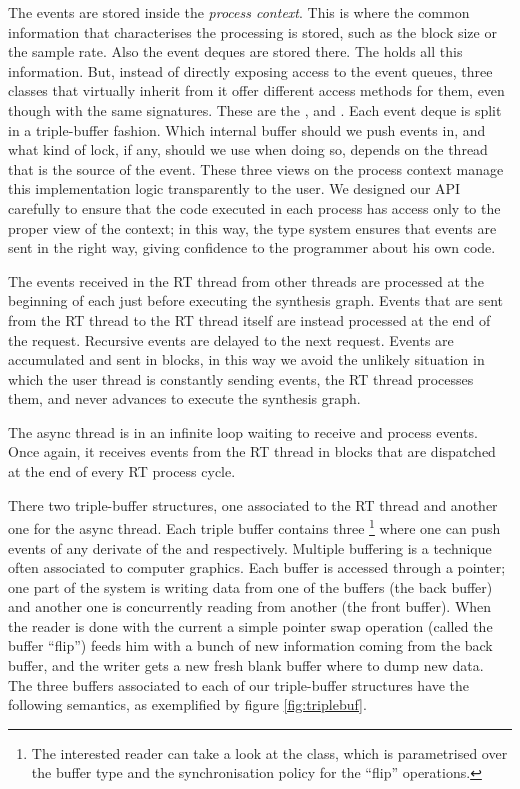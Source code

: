 The events are stored inside the \emph{process context}. This is where
the common information that characterises the processing is stored,
such as the block size or the sample rate. Also the event deques are
stored there. The  holds all this
information. But, instead of directly exposing access to the event
queues, three classes that virtually inherit from it offer different
access methods for them, even though with the same signatures. These
are the ,  and
. Each event deque is split in a
triple-buffer fashion. Which internal buffer should we push events in,
and what kind of lock, if any, should we use when doing so, depends on
the thread that is the source of the event. These three views on the
process context manage this implementation logic transparently to the
user. We designed our API carefully to ensure that the code executed
in each process has access only to the proper view of the context; in
this way, the type system ensures that events are sent in the right
way, giving confidence to the programmer about his own code.

The events received in the RT thread from other threads are processed
at the beginning of each  just before
executing the synthesis graph. Events that are sent from the RT thread
to the RT thread itself are instead processed at the end of the
request. Recursive events are delayed to the next request. Events are
accumulated and sent in blocks, in this way we avoid the unlikely
situation in which the user thread is constantly sending events, the
RT thread processes them, and never advances to execute the synthesis
graph.

\label{fig:triplebuf}
The async thread is in an infinite loop waiting to receive and process
events. Once again, it receives events from the RT thread in blocks
that are dispatched at the end of every RT process cycle.

There two triple-buffer structures, one associated to the RT thread
and another one for the async thread. Each triple buffer contains
three \footnote{The interested reader can take a
  look at the  class, which is
  parametrised over the buffer type and the synchronisation policy for
the ``flip'' operations.} where one can push events of any derivate of
the  and  respectively. Multiple
buffering is a technique often associated to computer graphics. Each
buffer is accessed through a pointer; one part of the system is
writing data from one of the buffers (the back buffer) and another one
is concurrently reading from another (the front buffer). When the
reader is done with the current a simple pointer swap operation
(called the buffer ``flip'') feeds him with a bunch of new information
coming from the back buffer, and the writer gets a new fresh blank
buffer where to dump new data. The three buffers associated to each of
our triple-buffer structures have the following semantics, as
exemplified by figure \ref{fig:triplebuf}.

